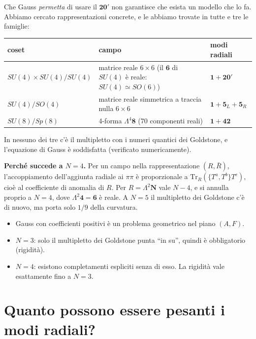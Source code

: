 \documentclass[11pt,a4paper]{article}
\numberwithin{equation}{section}
\theoremstyle{remark}
\newcommand{\Tr}{\mathrm{Tr}}
\begin{document}
Che Gauss \emph{permetta} di usare il $\mathbf{20}'$ non garantisce che esista un modello che lo fa. Abbiamo cercato rappresentazioni concrete, e le abbiamo trovate in tutte e tre le famiglie:
\begin{center}
\begin{tabular}{p{}p{}p{}}
\hline
coset & campo & modi radiali\\
\hline
$SU(4)\times SU(4)/SU(4)$ & matrice reale $6\times6$ (il $\mathbf6$ di $SU(4)$ è reale: $SU(4)\simeq SO(6)$) & $\mathbf1+\mathbf{20}'$\\
$SU(4)/SO(4)$ & matrice reale simmetrica a traccia nulla $6\times6$ & $\mathbf1+\mathbf5_L+\mathbf5_R$\\
$SU(8)/Sp(8)$ & 4-forma $\Lambda^4\mathbf8$ (70 componenti reali) & $\mathbf1+\mathbf{42}$\\
\hline
\end{tabular}
\end{center}
In nessuno dei tre c'è il multipletto con i numeri quantici dei Goldstone, e l'equazione di Gauss è soddisfatta (verificato numericamente).

\textbf{Perché succede a $N=4$.} Per un campo nella rappresentazione $(R,\bar R)$, l'accoppiamento dell'aggiunta radiale ai $\pi\pi$ è proporzionale a $\Tr_R(\{T^a,T^b\}T^c)$, cioè al coefficiente di anomalia di $R$. Per $R=\Lambda^2\mathbf N$ vale $N-4$, e si annulla proprio a $N=4$, dove $\Lambda^2\mathbf4=\mathbf6$ è reale. A $N=5$ il multipletto dei Goldstone c'è di nuovo, ma porta solo $1/9$ della curvatura.

\begin{porta}
\begin{itemize}[nosep]
\item Gauss con coefficienti positivi è un problema geometrico nel piano $(A,F)$.
\item $N=3$: solo il multipletto dei Goldstone punta ``in su'', quindi è obbligatorio (rigidità).
\item $N=4$: esistono completamenti espliciti senza di esso. La rigidità vale esattamente fino a $N=3$.
\end{itemize}
\end{porta}

\section{Quanto possono essere pesanti i modi radiali?}
\label{cap:unit}
\end{document}
